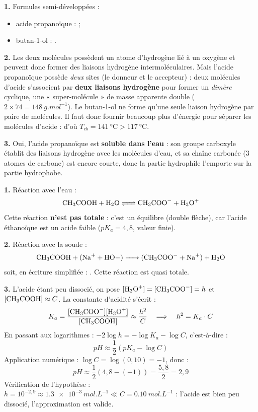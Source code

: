 \documentclass[11pt]{article}
\newcommand{\cle}[1]{{\popxbold\color{popdark}#1}}
\begin{document}
\begin{corrige}
\textbf{1.} Formules semi-développées :
\begin{itemize}
\item acide propanoïque :  ;
\item butan-1-ol : .
\end{itemize}

\textbf{2.} Les deux molécules possèdent un atome d'hydrogène lié à un oxygène et peuvent donc former des \cle{liaisons hydrogène} intermoléculaires. Mais l'acide propanoïque possède \emph{deux} sites (le  donneur et le  accepteur) : deux molécules d'acide s'associent par \textbf{deux liaisons hydrogène} pour former un \emph{dimère} cyclique, une « super-molécule » de masse apparente double ($2 \times 74 = \SI{148}{g.mol^{-1}}$). Le butan-1-ol ne forme qu'une seule liaison hydrogène par paire de molécules. Il faut donc fournir beaucoup plus d'énergie pour séparer les molécules d'acide : d'où $T_{eb} = \SI{141}{\celsius} > \SI{117}{\celsius}$.

\textbf{3.} Oui, l'acide propanoïque est \textbf{soluble dans l'eau} : son groupe carboxyle établit des liaisons hydrogène avec les molécules d'eau, et sa chaîne carbonée (3 atomes de carbone) est encore courte, donc la partie hydrophile l'emporte sur la partie hydrophobe.
\end{corrige}

\begin{corrige}
\textbf{1.} Réaction avec l'eau :
\[ \ce{CH3COOH + H2O <=> CH3COO- + H3O+} \]
Cette réaction \textbf{n'est pas totale} : c'est un équilibre (double flèche), car l'acide éthanoïque est un \cle{acide faible} ($pK_a = 4,8$, valeur finie).

\textbf{2.} Réaction avec la soude :
\[ \ce{CH3COOH + (Na+ + HO-) -> (CH3COO- + Na+) + H2O} \]
soit, en écriture simplifiée : . Cette réaction est quasi totale.

\textbf{3.} L'acide étant peu dissocié, on pose $[\ce{H3O+}] = [\ce{CH3COO-}] = h$ et $[\ce{CH3COOH}] \approx C$. La constante d'acidité s'écrit :
\[ K_a = \dfrac{[\ce{CH3COO-}][\ce{H3O+}]}{[\ce{CH3COOH}]} \approx \dfrac{h^2}{C} \quad\Longrightarrow\quad h^2 = K_a \cdot C \]
En passant aux logarithmes : $-2\log h = -\log K_a - \log C$, c'est-à-dire :
\[ pH \approx \dfrac{1}{2}\left(pK_a - \log C\right) \]
Application numérique : $\log C = \log(0,10) = -1$, donc :
\[ pH \approx \dfrac{1}{2}\left(4,8 - (-1)\right) = \dfrac{5,8}{2} = \boxed{2,9} \]
Vérification de l'hypothèse : $h = 10^{-2,9} \approx \SI{1,3e-3}{mol.L^{-1}} \ll C = \SI{0,10}{mol.L^{-1}}$ : l'acide est bien peu dissocié, l'approximation est valide.
\end{corrige}
\end{document}
